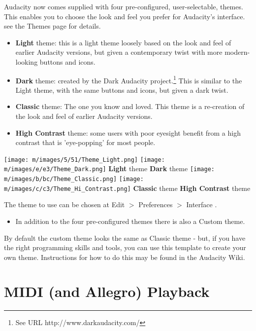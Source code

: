 Audacity now comes supplied with four pre-configured, user-selectable, themes.  This enables you to choose the look and feel you prefer for Audacity's interface. see the Themes page for details.
\begin{itemize}
\item \textbf{Light} theme: this is a light theme loosely based on the look and feel of earlier Audacity versions, but given a contemporary twist with more modern-looking buttons and icons. 
\item \textbf{Dark} theme: created by the Dark Audacity project.\footnote{See URL http://www.darkaudacity.com/} This is similar to the Light theme, with the same buttons and icons, but given a dark twist.
\item \textbf{Classic} theme: The one you know and loved. This theme is a re-creation of the look and feel of earlier Audacity versions. 
\item \textbf{High Contrast} theme: some users with poor eyesight benefit from a high contrast that is 'eye-popping' for most people.
\end{itemize}

\* \* \* \* \texttt{[image: m/images/5/51/Theme\_Light.png]}
\* \* \* \* \texttt{[image: m/images/e/e3/Theme\_Dark.png]}
\* \* \* \* 
\textbf{Light} theme
\* \* \* \* 
\textbf{Dark} theme
\* \* \* \* \texttt{[image: m/images/b/bc/Theme\_Classic.png]}
\* \* \* \* \texttt{[image: m/images/c/c3/Theme\_Hi\_Contrast.png]}
\* \* \* \* 
\textbf{Classic} theme
\* \* \* \* 
\textbf{High Contrast} theme


The theme to use can be chosen at 
Edit \mbox{$>$} Preferences \mbox{$>$} Interface
.  
\begin{itemize}
\item  In addition to the four pre-configured themes there is also a Custom theme.  
\end{itemize}
 By default the custom theme looks the same as Classic theme - but, if you have the right programming skills and tools, you can use this template to create your own theme.  Instructions for how to do this may be found in the Audacity Wiki.





\section{
MIDI (and Allegro) Playback
}


